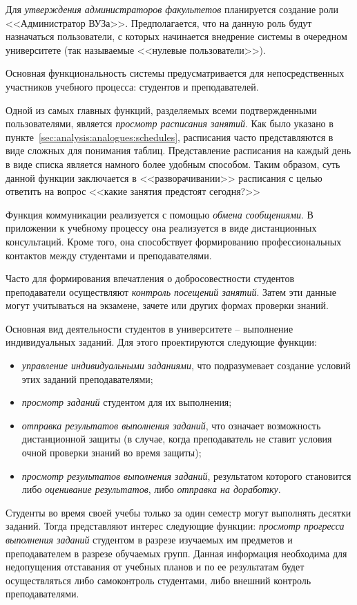 Для \emph{утверждения администраторов факультетов} планируется создание роли <<Администратор ВУЗа>>. Предполагается, что на данную роль будут назначаться пользователи, с которых начинается внедрение системы в очередном университете (так называемые <<нулевые пользователи>>). 

Основная функциональность системы предусматривается для непосредственных участников учебного процесса: студентов и преподавателей. 

Одной из самых главных функций, разделяемых всеми подтвержденными пользователями, является \emph{просмотр расписания занятий}. Как было указано в пункте~\ref{sec:analysis:analogues:schedules}, расписания часто представляются в виде сложных для понимания таблиц. Представление расписания на каждый день в виде списка является намного более удобным способом. Таким образом, суть данной функции заключается в <<разворачивании>> расписания с целью ответить на вопрос <<какие занятия предстоят сегодня?>>

Функция коммуникации реализуется с помощью \emph{обмена сообщениями}. В приложении к учебному процессу она реализуется в виде дистанционных консультаций. Кроме того, она способствует формированию профессиональных контактов между студентами и преподавателями.

Часто для формирования впечатления о добросовестности студентов преподаватели осуществляют \emph{контроль посещений занятий}. Затем эти данные могут учитываться на экзамене, зачете или других формах проверки знаний.

Основная вид деятельности студентов в университете -- выполнение индивидуальных заданий. Для этого проектируются следующие функции:

\begin{itemize}
	\item \emph{управление индивидуальными заданиями}, что подразумевает создание условий этих заданий преподавателями;
	\item \emph{просмотр заданий} студентом для их выполнения;
	\item \emph{отправка результатов выполнения заданий}, что означает возможность дистанционной защиты (в случае, когда преподаватель не ставит условия очной проверки знаний во время защиты);
	\item \emph{просмотр результатов выполнения заданий}, результатом которого становится либо \emph{оценивание результатов}, либо \emph{отправка на доработку}.
\end{itemize}

Студенты во время своей учебы только за один семестр могут выполнять десятки заданий. Тогда представляют интерес следующие функции: \emph{просмотр прогресса выполнения заданий} студентом в разрезе изучаемых им предметов и преподавателем в разрезе обучаемых групп. Данная информация необходима для недопущения отставания от учебных планов и по ее результатам будет осуществляться либо самоконтроль студентами, либо внешний контроль преподавателями.

